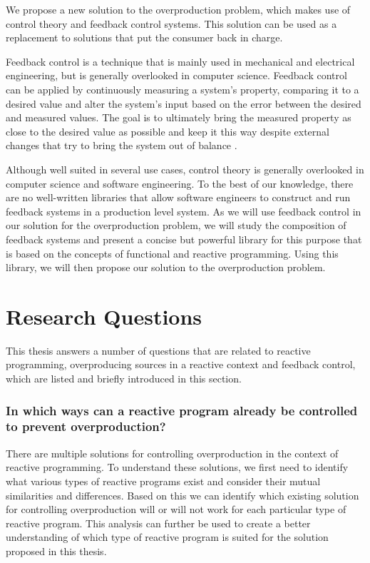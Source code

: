 We propose a new solution to the overproduction problem, which makes use of control theory and feedback control systems. This solution can be used as a replacement to solutions that put the consumer back in charge.

Feedback control is a technique that is mainly used in mechanical and electrical engineering, but is generally overlooked in computer science. Feedback control can be applied by continuously measuring a system's property, comparing it to a desired value and alter the system's input based on the error between the desired and measured values. The goal is to ultimately bring the measured property as close to the desired value as possible and keep it this way despite external changes that try to bring the system out of balance \cite{janert2013-feedback}.

Although well suited in several use cases, control theory is generally overlooked in computer science and software engineering. To the best of our knowledge, there are no well-written libraries that allow software engineers to construct and run feedback systems in a production level system. As we will use feedback control in our solution for the overproduction problem, we will study the composition of feedback systems and present a concise but powerful library for this purpose that is based on the concepts of functional and reactive programming. Using this library, we will then propose our solution to the overproduction problem.

\section*{Research Questions}
This thesis answers a number of questions that are related to reactive programming, overproducing sources in a reactive context and feedback control, which are listed and briefly introduced in this section.

\subsubsection*{In which ways can a reactive program already be controlled to prevent overproduction?}
There are multiple solutions for controlling overproduction in the context of reactive programming. To understand these solutions, we first need to identify what various types of reactive programs exist and consider their mutual similarities and differences. Based on this we can identify which existing solution for controlling overproduction will or will not work for each particular type of reactive program. This analysis can further be used to create a better understanding of which type of reactive program is suited for the solution proposed in this thesis.

